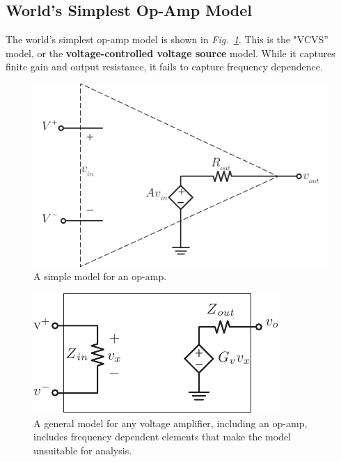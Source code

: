 \subsection{World's Simplest Op-Amp Model}
The world's simplest op-amp model is shown in \emph{Fig.~\ref{fig:opamp_model}}. This is the "VCVS'' model, or the \textbf{voltage-controlled voltage source} model.  While it captures finite gain and output resistance, it fails to capture frequency dependence.
\vspace{0.5cm}
\begin{figure}[H]
\centering
\includegraphics[scale=1.25]{opamp_model}
\caption{A simple model for an op-amp.}
\label{fig:opamp_model}
\end{figure}
\newpage
\begin{figure}[t]
\centering
\includegraphics[scale=1.35]{vampmodelz}
\caption{A general model for any voltage amplifier, including an op-amp, includes frequency dependent elements that make the model unsuitable for analysis.}
\label{fig:vampmodelz}
\end{figure}
